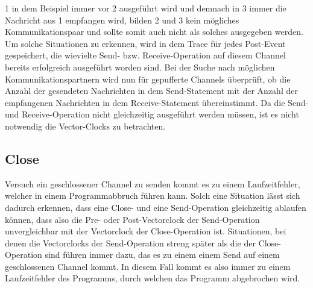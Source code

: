 1 in dem Beispiel immer vor 2 ausgeführt wird und demnach in 3 immer die 
Nachricht aus 1 empfangen wird, bilden 2 und 3 kein mögliches Kommunikationspaar
und sollte somit auch nicht als solches ausgegeben werden. Um solche Situationen 
zu erkennen, wird in dem Trace für jedes Post-Event gespeichert, die 
wievielte Send- bzw. Receive-Operation auf diesem Channel bereits erfolgreich 
ausgeführt worden sind. Bei der Suche nach möglichen Kommunikationspartnern 
wird nun für gepufferte Channels überprüft, ob die Anzahl der gesendeten 
Nachrichten in dem Send-Statement mit der Anzahl der empfangenen 
Nachrichten in dem Receive-Statement übereinstimmt. Da die 
Send- und Receive-Operation nicht gleichzeitig ausgeführt werden müssen, 
ist es nicht notwendig die Vector-Clocks zu betrachten.

\subsection{Close}
Versuch ein geschlossener Channel zu senden kommt es zu einem Laufzeitfehler, 
welcher in einem Programmabbruch führen kann. Solch eine Situation lässt sich 
dadurch erkennen, dass eine Close- und eine Send-Operation 
gleichzeitig ablaufen können, dass also die Pre- oder Post-Vectorclock 
der Send-Operation unvergleichbar mit der Vectorclock der Close-Operation 
ist. Situationen, bei denen die Vectorclocks der Send-Operation streng später 
als die der Close-Operation sind führen immer dazu, das es zu einem einem 
Send auf einem geschlossenen Channel kommt. In diesem Fall kommt es also immer 
zu einem Laufzeitfehler des Programms, durch welchen das Programm abgebrochen wird.

